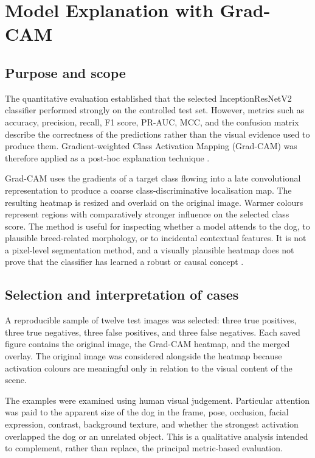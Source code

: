 \chapter{Model Explanation with Grad-CAM}
\label{chap:explanation}

\section{Purpose and scope}

The quantitative evaluation established that the selected InceptionResNetV2 classifier performed strongly on the controlled test set. However, metrics such as accuracy, precision, recall, F1 score, PR-AUC, MCC, and the confusion matrix describe the correctness of the predictions rather than the visual evidence used to produce them. Gradient-weighted Class Activation Mapping (Grad-CAM) was therefore applied as a post-hoc explanation technique \citep{selvaraju2017gradcam}.

Grad-CAM uses the gradients of a target class flowing into a late convolutional representation to produce a coarse class-discriminative localisation map. The resulting heatmap is resized and overlaid on the original image. Warmer colours represent regions with comparatively stronger influence on the selected class score. The method is useful for inspecting whether a model attends to the dog, to plausible breed-related morphology, or to incidental contextual features. It is not a pixel-level segmentation method, and a visually plausible heatmap does not prove that the classifier has learned a robust or causal concept \citep{adebayo2018sanity,rudin2019stop}.

\section{Selection and interpretation of cases}

A reproducible sample of twelve test images was selected: three true positives, three true negatives, three false positives, and three false negatives. Each saved figure contains the original image, the Grad-CAM heatmap, and the merged overlay. The original image was considered alongside the heatmap because activation colours are meaningful only in relation to the visual content of the scene.

The examples were examined using human visual judgement. Particular attention was paid to the apparent size of the dog in the frame, pose, occlusion, facial expression, contrast, background texture, and whether the strongest activation overlapped the dog or an unrelated object. This is a qualitative analysis intended to complement, rather than replace, the principal metric-based evaluation.

